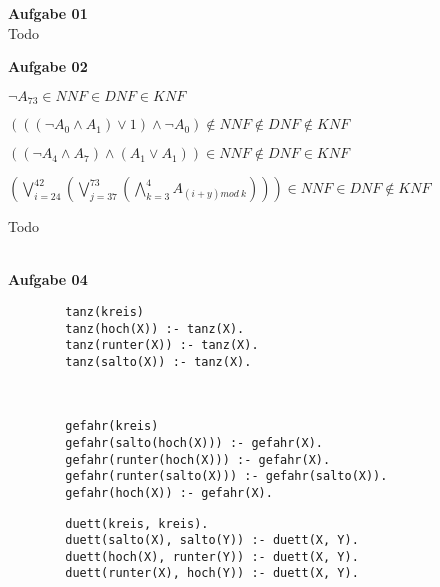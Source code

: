 \documentclass[a4paper,10pt]{article}
\begin{document}
	\parindent0pt
	\textbf{Aufgabe 01} \\
	Todo
	
	\textbf{Aufgabe 02} \\
	\begin{compactenum} [(a)]
		\item 
		\begin{compactenum} [(i)]
			\item $ \lnot A_{73} \in NNF \in DNF \in KNF $
			\item $ (((\lnot A_0 \wedge A_1)\vee 1)\wedge \lnot A_0) \not\in NNF \not\in DNF \not\in KNF$
			\item $ ((\lnot A_4 \wedge A_7)\wedge (A_1 \vee A_1)) \in NNF \not\in DNF \in KNF $
			\item $ (\bigvee\limits_{i = 24}^{42} (\bigvee\limits_{j=37}^{73} (\bigwedge\limits_{k=3}^{4} A_{(i+y) mod\ k}))) \in NNF \in DNF \not\in KNF $
		\end{compactenum}
		\item Todo
	\end{compactenum}\ \\
	\textbf{Aufgabe 04}\
	\begin{compactenum} [(a)]
		\item 
		\begin{verbatim}
		tanz(kreis)
		tanz(hoch(X)) :- tanz(X).
		tanz(runter(X)) :- tanz(X).
		tanz(salto(X)) :- tanz(X).
		\end{verbatim}\
		\item 
		\begin{verbatim}
		gefahr(kreis)
		gefahr(salto(hoch(X))) :- gefahr(X).
		gefahr(runter(hoch(X))) :- gefahr(X).
		gefahr(runter(salto(X))) :- gefahr(salto(X)).
		gefahr(hoch(X)) :- gefahr(X).
		\end{verbatim}
		\item 
		\begin{verbatim}
		duett(kreis, kreis).
		duett(salto(X), salto(Y)) :- duett(X, Y).
		duett(hoch(X), runter(Y)) :- duett(X, Y).
		duett(runter(X), hoch(Y)) :- duett(X, Y).
		\end{verbatim}
	\end{compactenum}
\end{document}
